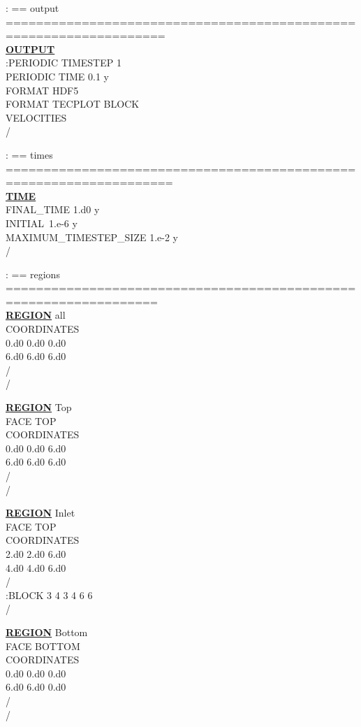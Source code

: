 \noindent
: == output ===================================================================\\
\hyperlink{target_output}{\bf OUTPUT}\\
:PERIODIC TIMESTEP 1\\
PERIODIC TIME 0.1 y\\
FORMAT HDF5\\
FORMAT TECPLOT BLOCK\\
VELOCITIES\\
/

\noindent
: == times ====================================================================\\
\hyperlink{target_time}{\bf TIME}\\
FINAL\_TIME 1.d0 y\\
INITIAL\ 1.e-6 y\\
MAXIMUM\_TIMESTEP\_SIZE 1.e-2 y\\
/

\noindent
: == regions ==================================================================\\
\hyperlink{target_region}{\bf REGION} all\\
COORDINATES\\
0.d0 0.d0 0.d0\\
6.d0 6.d0 6.d0\\
/\\
/

\noindent
\hyperlink{target_region}{\bf REGION} Top\\
FACE TOP\\
COORDINATES\\
0.d0 0.d0 6.d0\\
6.d0 6.d0 6.d0\\
/\\
/

\noindent
\hyperlink{target_region}{\bf REGION} Inlet\\
FACE TOP\\
COORDINATES\\
2.d0 2.d0 6.d0\\
4.d0 4.d0 6.d0\\
/\\
:BLOCK 3 4 3 4 6 6\\
/

\noindent
\hyperlink{target_region}{\bf REGION} Bottom\\
FACE BOTTOM\\
COORDINATES\\
0.d0 0.d0 0.d0\\
6.d0 6.d0 0.d0\\
/\\
/

